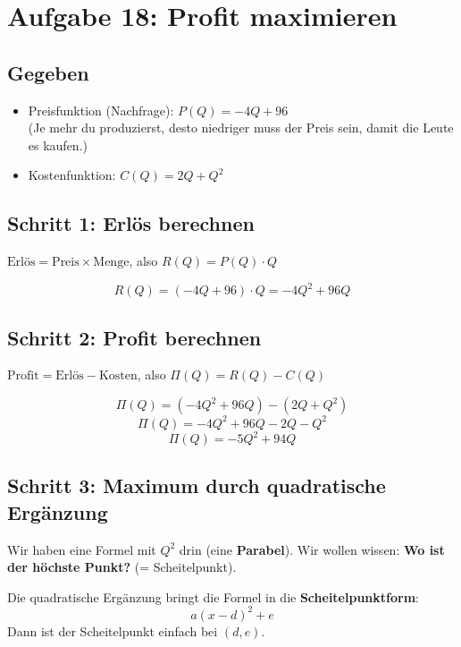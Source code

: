 \documentclass[12pt,a4paper]{article}
\begin{document}
\section{Aufgabe 18: Profit maximieren}

\subsection{Gegeben}

\begin{itemize}
  \item Preisfunktion (Nachfrage): $P(Q) = -4Q + 96$\\
        (Je mehr du produzierst, desto niedriger muss der Preis sein, damit die Leute es kaufen.)
  \item Kostenfunktion: $C(Q) = 2Q + Q^2$
\end{itemize}

\subsection{Schritt 1: Erl\"os berechnen}

\begin{merkbox}
$\text{Erl\"os} = \text{Preis} \times \text{Menge}$, also $R(Q) = P(Q) \cdot Q$
\end{merkbox}

\[
  R(Q) = (-4Q + 96) \cdot Q = -4Q^2 + 96Q
\]

\subsection{Schritt 2: Profit berechnen}

\begin{merkbox}
$\text{Profit} = \text{Erl\"os} - \text{Kosten}$, also $\Pi(Q) = R(Q) - C(Q)$
\end{merkbox}

\[
  \Pi(Q) = (-4Q^2 + 96Q) - (2Q + Q^2)
\]
\[
  \Pi(Q) = -4Q^2 + 96Q - 2Q - Q^2
\]
\[
  \Pi(Q) = -5Q^2 + 94Q
\]

\subsection{Schritt 3: Maximum durch quadratische Erg\"anzung}

\begin{merkbox}[title={Quadratische Erg\"anzung -- Warum?}]
Wir haben eine Formel mit $Q^2$ drin (eine \textbf{Parabel}). Wir wollen wissen: \textbf{Wo ist der h\"ochste Punkt?} (= Scheitelpunkt).

Die quadratische Erg\"anzung bringt die Formel in die \textbf{Scheitelpunktform}:
\[
  a(x - d)^2 + e
\]
Dann ist der Scheitelpunkt einfach bei $(d, e)$.
\end{merkbox}
\end{document}
